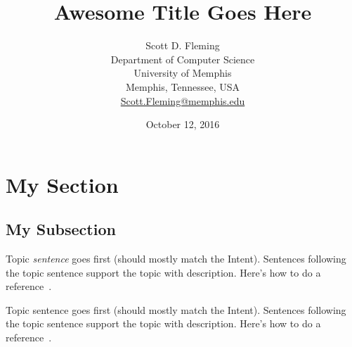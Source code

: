\documentclass[11pt, letterpaper, onecolumn]{article}
\begin{document}

\title{Awesome Title Goes Here}

\author{%
Scott D. Fleming\\%
Department of Computer Science\\%
University of Memphis\\%
Memphis, Tennessee, USA\\%
\href{mailto:Scott.Fleming@memphis.edu}{Scott.Fleming@memphis.edu}%
}

\date{October 12, 2016}

\maketitle



\section{My Section}


\subsection{My Subsection}



%
Topic \emph{sentence} goes first (should mostly match the Intent).
%
Sentences following the topic sentence support the topic with description.
%
Here's how to do a reference~\cite{Robillard2004TSE}.



%
Topic sentence goes first (should mostly match the Intent).
%
Sentences following the topic sentence support the topic with description.
%
Here's how to do a reference~\cite{Robillard2004TSE}.







\end{document}
